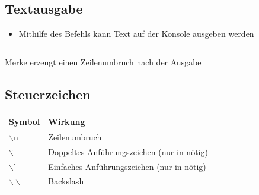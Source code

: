 \subsection{Textausgabe}
\begin{frame}
	\slidehead
	\begin{itemize}
		\item Mithilfe des Befehls  kann Text auf der Konsole ausgeben werden
	\end{itemize}
	\begin{columns}
		\begin{column}{6cm}
		\end{column}
		\begin{column}{6cm}
		\end{column}
	\end{columns}
	\vspace{0.25cm}
	\begin{block}{Merke}
		 erzeugt einen Zeilenumbruch nach der Ausgabe
	\end{block}
\end{frame}

\subsection{Steuerzeichen}
\begin{frame}
	\slidehead

	\begin{table}[htbp]
		\begin{tabular}{|l|l|}
			\hline
			\textbf{Symbol} & \textbf{Wirkung} \\ \hline
			$\backslash$n & Zeilenumbruch \\ \hline
			$\backslash$\" & Doppeltes Anführungszeichen  (nur in \pythoninline{" "} nötig) \\ \hline
			$\backslash$' & Einfaches Anführungszeichen (nur in \pythoninline{' '} nötig) \\ \hline
			$\backslash \backslash$ & Backslash \\ \hline
		\end{tabular}
		\label{}
	\end{table}

\end{frame}

